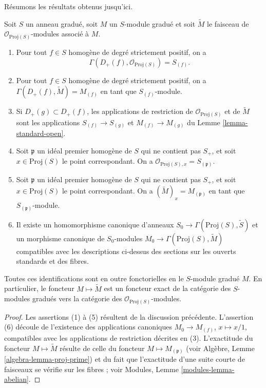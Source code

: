 \noindent
Résumons les résultats obtenus jusqu'ici.

\begin{lemma}
\label{lemma-proj-sheaves}
Soit $S$ un anneau gradué, soit $M$ un $S$-module gradué et soit
$\widetilde M$ le faisceau de $\mathcal{O}_{\text{Proj}(S)}$-modules associé
à $M$.
\begin{enumerate}
\item Pour tout $f \in S$ homogène de degré strictement positif, on a
$$
\Gamma(D_{+}(f), \mathcal{O}_{\text{Proj}(S)}) = S_{(f)}.
$$
\item Pour tout $f\in S$ homogène de degré strictement positif, on a
$\Gamma(D_{+}(f), \widetilde M) = M_{(f)}$ en tant que $S_{(f)}$-module.
\item Si $D_{+}(g) \subset D_{+}(f)$, les applications de restriction de
$\mathcal{O}_{\text{Proj}(S)}$ et de $\widetilde M$ sont les applications
$S_{(f)} \to S_{(g)}$ et $M_{(f)} \to M_{(g)}$ du
Lemme \ref{lemma-standard-open}.
\item Soit $\mathfrak p$ un idéal premier
homogène de $S$ qui ne contient pas
$S_{+}$, et soit $x \in \text{Proj}(S)$ le point correspondant. On a
$\mathcal{O}_{\text{Proj}(S), x} = S_{(\mathfrak p)}$.
\item Soit $\mathfrak p$ un idéal premier
homogène de $S$ qui ne contient pas
$S_{+}$, et soit $x \in \text{Proj}(S)$ le point correspondant. On a
$(\widetilde M)_x = M_{(\mathfrak p)}$ en tant que
$S_{(\mathfrak p)}$-module.
\item
\label{item-map}
Il existe un homomorphisme canonique d'anneaux
$
S_0 \longrightarrow \Gamma(\text{Proj}(S), \widetilde S)
$
et un morphisme canonique de $S_0$-modules
$
M_0 \longrightarrow \Gamma(\text{Proj}(S), \widetilde M)
$
compatibles avec les descriptions ci-dessus des sections sur les ouverts
standards et des fibres.
\end{enumerate}
Toutes ces identifications sont en outre fonctorielles
en le $S$-module gradué $M$. En particulier,
le foncteur $M \mapsto \widetilde M$ est un
foncteur exact de la catégorie des $S$-modules gradués vers la catégorie des
$\mathcal{O}_{\text{Proj}(S)}$-modules.
\end{lemma}

\begin{proof}
Les assertions (1) à (5) résultent de la discussion précédente.
L'assertion (6) découle de l'existence des applications canoniques
$M_0 \to M_{(f)}$, $x \mapsto x/1$, compatibles avec les applications de
restriction décrites en (3). L'exactitude du foncteur
$M \mapsto \widetilde M$ résulte de celle du foncteur
$M \mapsto M_{(\mathfrak p)}$ (voir Algèbre,
Lemme \ref{algebra-lemma-proj-prime}) et du fait que l'exactitude d'une suite
courte de faisceaux se vérifie sur les fibres ; voir Modules,
Lemme \ref{modules-lemma-abelian}.
\end{proof}

